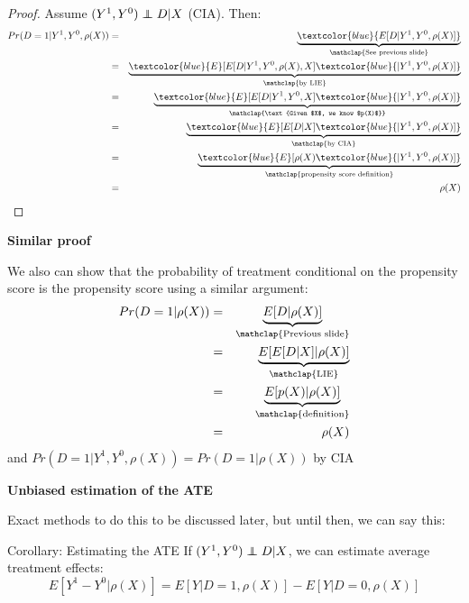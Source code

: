 \documentclass[notes=show]{beamer}
\newcommand\independent{\protect\mathpalette{\protect\independenT}{\perp}}
\def\independenT#1#2{\mathrel{\rlap{$#1#2$}\mkern2mu{#1#2}}}
\begin{document}
\begin{frame}[plain,shrink=5]
	
	\begin{proof}
	Assume $(Y^1,Y^0)\independent{D}|X$ (CIA).  Then:
		\begin{eqnarray*}
		Pr(D=1 | Y^1,Y^0, \rho(X)) &=& \underbrace{\textcolor{blue}{E[D | Y^1, Y^0, \rho(X)]}}_{ \mathclap{\text{See previous slide}}} \\
		&=&\underbrace{\textcolor{blue}{E} [ E [ D | Y^1,Y^0, \rho(X), X] \textcolor{blue}{| Y^1,Y^0,\rho(X)]}}_{ \mathclap{\text{by LIE}}} \\
		&=&\underbrace{\textcolor{blue}{E} [ E [ D | Y^1,Y^0,X] \textcolor{blue}{| Y^1,Y^0,\rho(X)]}}_{ \mathclap{\text{Given $X$, we know $p(X)$}}} \\
		&=&\underbrace{\textcolor{blue}{E} [E [D | X] \textcolor{blue}{| Y^1,Y^0,\rho(X)]}}_{ \mathclap{\text{by CIA}}} \\
		&=& \underbrace{\textcolor{blue}{E}[\rho(X) \textcolor{blue}{| Y^1, Y^0, \rho(X)]}}_{ \mathclap{\text{propensity score definition}}} \\
		&=& \rho(X)
		\end{eqnarray*}
	\end{proof}
	
\end{frame}

\begin{frame}[plain]
\begin{center}
\textbf{Similar proof}
\end{center}

	 We also can show that the probability of treatment conditional on the propensity score is the propensity score using a similar argument:
		\begin{eqnarray*}
		Pr(D=1| \rho(X)) &=& \underbrace{E[ D | \rho(X) ]}_{\mathclap{\text{Previous slide}}} \\
		&=& \underbrace{E [ E [D | X] | \rho(X)]}_{ \mathclap{\text{LIE}}} \\
		&=& \underbrace{E[p(X) | \rho(X)]}_{ \mathclap{\text{definition}}} \\
		&=& \rho(X)
		\end{eqnarray*}and $Pr(D=1 | Y^1, Y^0, \rho(X)) = Pr(D=1| \rho(X))$ by CIA
\end{frame}


\begin{frame}[plain]
\begin{center}
\textbf{Unbiased estimation of the ATE}
\end{center}

Exact methods to do this to be discussed later, but until then, we can say this:
	\begin{block}{Corollary: Estimating the ATE}
	If $(Y^1,Y^0)\independent{D}|X$, we can estimate average treatment effects:
 $$E[Y^1-Y^0|\rho(X)] = E[Y|D=1,\rho(X)] - E[Y|D=0,\rho(X)]$$
	\end{block}
	
\end{frame}
\end{document}
